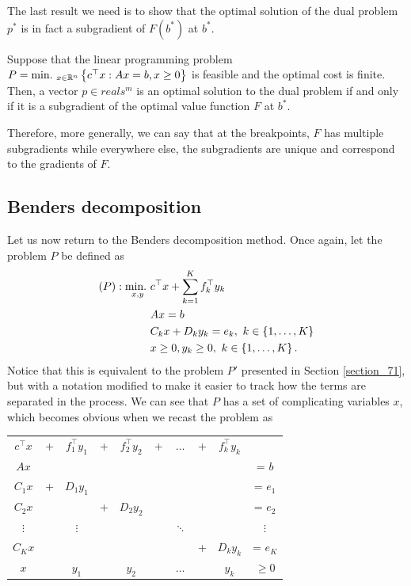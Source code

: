 The last result we need is to show that the optimal solution of the dual problem $p^*$ is in fact a subgradient of $F(b^*)$ at $b^*$.

\begin{theorem}
	Suppose that the linear programming problem $P = \mathop{\text{min.~}}_{x \in \mathbb{R}^n}\left\{ c^\top x : Ax = b, x \ge 0 \right \}$ is feasible and the optimal cost is finite. Then, a vector $p \in reals^m$ is an optimal solution to the dual problem if and only if it is a subgradient of the optimal value function $F$ at $b^*$.
\end{theorem}


Therefore, more generally, we can say that at the breakpoints, $F$ has multiple subgradients while everywhere else, the subgradients are unique and correspond to the gradients of $F$.


\subsection{Benders decomposition}

Let us now return to the Benders decomposition method. Once again, let the problem $P$ be defined as
%
\begin{align*}
	(P) :\mathop{\text{min.~}}_{x,y} & c^\top x + \sum_{k=1}^K f_k^\top y_k \\
		  			 & Ax = b \\
		  			 & C_k x + D_k y_k = e_k, \ k \in \left\{ 1, \dots, K \right \} \\
		  			 & x \geq 0, y_k \geq 0, \ k \in \left\{ 1,\dots, K \right \}. 
\end{align*}
%
Notice that this is equivalent to the problem $P'$ presented in Section \ref{section_71}, but with a notation modified to make it easier to track how the terms are separated in the process. We can see that $P$ has a set of complicating variables $x$, which becomes obvious when we recast the problem as
%
\begin{center}
	\begin{tabular}{cccccccccc}
		 $c^\top x$ & + & $f_1^\top y_1$ & + & $f_2^\top y_2$ & + & $\dots$ & + & $f_k^\top y_k$  &  \\
	 	 $Ax$       &   &                &   &                &   &         &   &                 & = $b$ \\
		 $C_1 x$    & + & $D_1 y_1$      &   &                &   &         &   &                 & = $e_1$  \\
		 $C_2 x$    &   &                & + & $D_2 y_2$      &   &         &   &                 & = $e_2$    \\
		 $\vdots$   &   &  $\vdots$      &   &                &   & $\ddots$&   &                 &  $\vdots$   \\
		 $C_K x$    &   &                &   &                &   &         & + & $D_k y_k$       & = $e_K$  \\
		 $x$        &   & $y_1$          &   &  $y_2$         &   & $\dots$ &   & $y_k$           & $\geq 0$  
	\end{tabular}	
\end{center}
 
